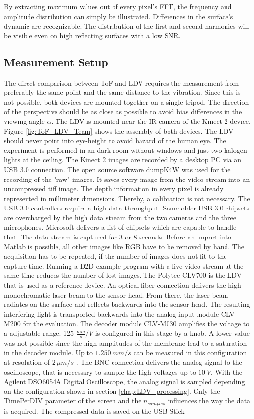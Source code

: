By extracting maximum values out of every pixel's FFT, the frequency and amplitude distribution can simply be illustrated. Differences in the surface's dynamic are recognizable. The distribution of the first and second harmonics will be visible even on high reflecting surfaces with a low SNR. 
  
\subsection{Measurement Setup}
  
The direct comparison between ToF and LDV requires the measurement from preferably the same point and the same distance to the vibration. Since this is not possible, both devices are mounted together on a single tripod. The direction of the perspective should be as close as possible to avoid bias differences in the viewing angle $\alpha$. The LDV is mounted near the IR camera of the Kinect 2 device. Figure \ref{fig:ToF_LDV_Team} shows the assembly of both devices. The LDV should never point into eye-height to avoid hazard of the human eye. The experiment is performed in an dark room without windows and just two halogen lights at the ceiling. The Kinect 2 images are recorded by a desktop PC via an USB 3.0 connection. The open source software dumpK4W was used for the recording of the "raw" images. It saves every image from the video stream into an uncompressed tiff image. The depth information in every pixel is already represented in millimeter dimensions. Thereby, a calibration is not necessary. The USB 3.0 controllers require a high data throughput. Some older USB 3.0 chipsets are overcharged by the high data stream from the two cameras and the three microphones. Microsoft delivers a list of chipsets which are capable to handle that. The data stream is captured for 3 or 8 seconds. Before an import into Matlab is possible, all other images like RGB have to be removed by hand. The acquisition has to be repeated, if the number of images does not fit to the capture time. Running a D2D example program with a live video stream at the same time reduces the number of lost images. The Polytec CLV700 is the LDV that is used as a reference device. An optical fiber connection delivers the high monochromatic laser beam to the sensor head. From there, the laser beam radiates on the surface and reflects backwards into the sensor head. The resulting interfering light is transported backwards into the analog input module CLV-M200 for the evaluation. The decoder module CLV-M030 amplifies the voltage to a adjustable range. 125 $\frac{mm}{s}/V$ is configured in this stage by a knob. A lower value was not possible since the high amplitudes of the membrane lead to a saturation in the decoder module. Up to $1.250~mm/s$ can be measured in this configuration at resolution of $2~\mu m/s$ \cite{CLVpolytec}. The BNC connection delivers the analog signal to the oscilloscope, that is necessary to sample the high voltages up to $10~V$. With the Agilent DSO6054A Digital Oscilloscope, the analog signal is sampled depending on the configuration shown in section \ref{chap:LDV_processing}. Only the TimePerDIV parameter of the screen and the $n_{samples}$ influences the way the data is acquired. The compressed data is saved on the USB Stick 